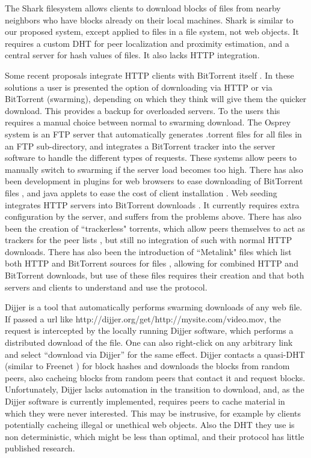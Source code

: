 The Shark \cite{shark} filesystem allows clients to download blocks of files from nearby neighbors who have blocks already on their local machines.  
Shark is similar to our proposed system, except applied to files in a file system, not web objects.  It  requires a custom DHT for peer localization and proximity estimation, 
and a central server for hash values of files.  It also lacks HTTP integration.

Some recent proposals integrate HTTP clients with BitTorrent itself \cite{webtorrent}.  In these solutions a user is presented the option of downloading via HTTP or via BitTorrent (swarming), 
depending on which they think will give them the quicker download.  This provides a backup for overloaded servers.  To the users this requires a manual choice between normal to 
swarming download.  
The Osprey system \cite{osprey} is an FTP server that automatically generates .torrent files for all files in an FTP sub-directory, 
and integrates a BitTorrent tracker into the server software to handle the different types of requests.  
These systems allow peers to manually switch to swarming if the server load becomes too high.  
There has also been development in plugins for web browsers to ease downloading of BitTorrent files \cite{opera, foxtorrent}, and java applets to ease the cost of client installation \cite{bitlet}.
Web seeding integrates HTTP servers into BitTorrent downloads \cite{bittorrent_wikipedia}.  It currently requires extra configuration by the server, 
and suffers from the problems above.  There has also been the creation of ``trackerless" torrents, which allow peers themselves to act as trackers for the peer lists \cite{bittorrent_wikipedia}, but still no integration of such
with normal HTTP downloads.  There has also been the introduction of ``Metalink" files which list both HTTP and BitTorrent sources for files \cite{metalink_wikipedia}, 
allowing for combined HTTP and BitTorrent downloads, but use of these files requires their creation and that both servers and clients to understand and use the protocol.

Dijjer \cite{dijjer} is a tool that automatically performs swarming downloads of any web file.  
If passed a url like http://dijjer.org/get/http://mysite.com/video.mov, the request is intercepted by the locally running Dijjer software, 
which performs a distributed download of the file.  One can also right-click on any arbitrary link and select ``download via Dijjer'' for the same effect. 
Dijjer contacts a quasi-DHT (similar to Freenet \cite{freenet}) for block hashes and downloads the blocks from random peers, 
also cacheing blocks from random peers that contact it and request blocks.  Unfortunately, Dijjer lacks automation in the transition to download, and, 
as the Dijjer software is currently implemented, requires peers to cache material in which they were never interested.
This may be instrusive, for example by clients potentially cacheing illegal or unethical web objects.  Also the DHT they use is non deterministic, which might be less than optimal,
and their protocol has little published research.

